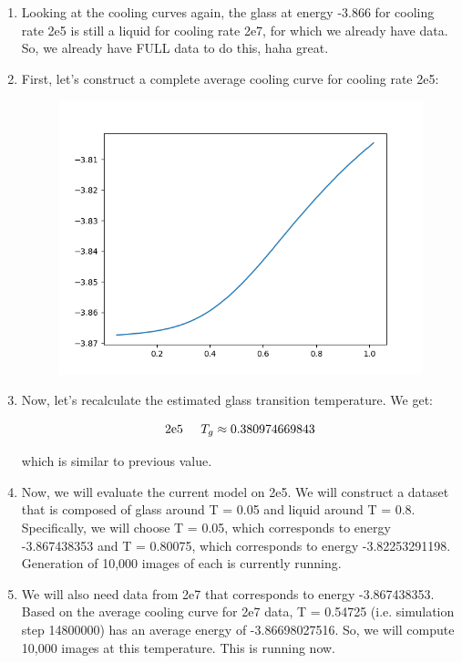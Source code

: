 \documentclass[12pt,reqno]{amsart}
\numberwithin{equation}{section}
\begin{document}
\begin{enumerate}
\item Looking at the cooling curves again, the glass at energy -3.866 for cooling rate 2e5 is still a liquid for cooling rate 2e7, for which we already have data.  So, we already have FULL data to do this, haha great.
\item First, let's construct a complete average cooling curve for cooling rate 2e5: 

\begin{figure}[H]
\centering
\includegraphics[scale=0.6]{average_cooling_data_N2e5_full}
\end{figure}

\item Now, let's recalculate the estimated glass transition temperature.  We get:   

\begin{align}
\begin{split}
\text{2e5} \hspace{5mm} T_g \approx 0.380974669843 \\
\end{split}
\end{align}

which is similar to previous value.  

\item Now, we will evaluate the current model on 2e5.  We will construct a dataset that is composed of glass around T = 0.05 and liquid around T = 0.8.  Specifically, we will choose T = 0.05, which corresponds to energy -3.867438353 and T = 0.80075, which corresponds to energy -3.82253291198.   Generation of 10,000 images of each is currently running.  

\item We will also need data from 2e7 that corresponds to energy -3.867438353.  Based on the average cooling curve for 2e7 data, T = 0.54725 (i.e. simulation step 14800000) has an average energy of -3.86698027516.  So, we will compute 10,000 images at this temperature.  This is running now.  
\end{enumerate}
\end{document}

